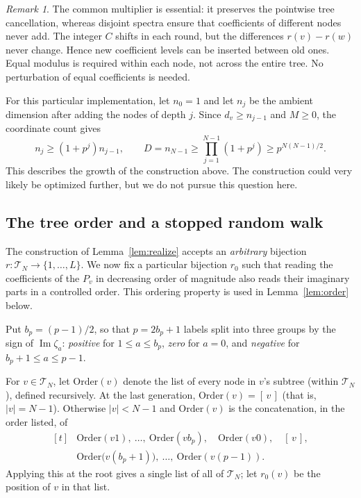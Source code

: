 \documentclass[11pt]{amsart}
\theoremstyle{definition}
\theoremstyle{remark}
\newtheorem{remark}[theorem]{Remark}
\newcommand{\T}{\mathcal T}
\DeclareMathOperator{\Impart}{Im}
\begin{document}
\begin{remark}\label{rem:important}
The common multiplier is essential: it preserves the pointwise
tree cancellation, whereas disjoint spectra ensure that coefficients
of different nodes never add. The integer \(C\) shifts in each
round, but the differences \(r(v)-r(w)\) never change. Hence new
coefficient levels can be inserted between old ones.
Equal modulus is required within each node, not across the entire
tree. No perturbation of equal coefficients is needed.

For this particular implementation, let \(n_0=1\) and let \(n_j\)
be the ambient dimension after adding the nodes of depth \(j\).
Since \(d_v\geq n_{j-1}\) and \(M\geq0\), the coordinate count gives
\[
 n_j\geq(1+p^j)n_{j-1},\qquad
 D=n_{N-1}\geq\prod_{j=1}^{N-1}(1+p^j)
       \geq p^{N(N-1)/2}.
\]
This describes the growth of the construction above. The construction
could very likely be optimized further, but we do not pursue this question here.
\end{remark}

\subsection{The tree order and a stopped random walk}
\label{sec:tree-order}

The construction of Lemma~\ref{lem:realize} accepts an \emph{arbitrary}
bijection \(r:\T_N\to\{1,\ldots,L\}\). We now fix a particular
bijection \(r_0\) such that reading the coefficients of the \(P_v\) in
decreasing order of magnitude also reads their imaginary parts in a
controlled order. This ordering property is used in Lemma~\ref{lem:order}
below.

Put \(b_p=(p-1)/2\), so that \(p=2b_p+1\) labels split into three
groups by the sign of \(\Impart\zeta_a\): \textit{positive }for
\(1\leq a\leq b_p\), \textit{zero} for \(a=0\), and \textit{negative }for
\(b_p+1\leq a\leq p-1\).

For \(v\in\T_N\), let \(\mathrm{Order}(v)\) denote the list of every
node in \(v\)'s subtree (within \(\T_N\)), defined recursively. At the
last generation, \(\mathrm{Order}(v)=[\,v\,]\) (that is, \(|v|=N-1\)).
Otherwise \(|v|<N-1\) and \(\mathrm{Order}(v)\) is the concatenation,
in the order listed, of
\[
 \begin{aligned}[t]
  &\mathrm{Order}(v1),\ \ldots,\ \mathrm{Order}(vb_p),\quad
   \mathrm{Order}(v0),\quad [\,v\,],\\
  &\mathrm{Order}\bigl(v(b_p{+}1)\bigr),\ \ldots,\ \mathrm{Order}(v(p{-}1)).
 \end{aligned}
\]
Applying this at the root gives a single list of all of \(\T_N\); let
\(r_0(v)\) be the position of \(v\) in that list.
\end{document}
